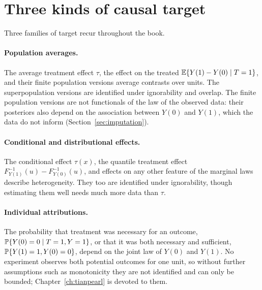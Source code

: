 \section{Three kinds of causal target}\label{sec:targets}

Three families of target recur throughout the book.

\paragraph{Population averages.} The average treatment effect $\tau$, the effect on the treated $\mathbb{E}\{Y(1) - Y(0) \mid T = 1\}$, and their finite population versions average contrasts over units. The superpopulation versions are identified under ignorability and overlap. The finite population versions are not functionals of the law of the observed data: their posteriors also depend on the association between $Y(0)$ and $Y(1)$, which the data do not inform (Section~\ref{sec:imputation}).

\paragraph{Conditional and distributional effects.} The conditional effect $\tau(x)$, the quantile treatment effect $F_{Y(1)}^{-1}(u) - F_{Y(0)}^{-1}(u)$, and effects on any other feature of the marginal laws describe heterogeneity. They too are identified under ignorability, though estimating them well needs much more data than $\tau$.

\paragraph{Individual attributions.} The probability that treatment was necessary for an outcome, $\mathbb{P}\{Y(0) = 0 \mid T = 1, Y = 1\}$, or that it was both necessary and sufficient, $\mathbb{P}\{Y(1) = 1, Y(0) = 0\}$, depend on the joint law of $Y(0)$ and $Y(1)$. No experiment observes both potential outcomes for one unit, so without further assumptions such as monotonicity they are not identified and can only be bounded; Chapter~\ref{ch:tianpearl} is devoted to them.

